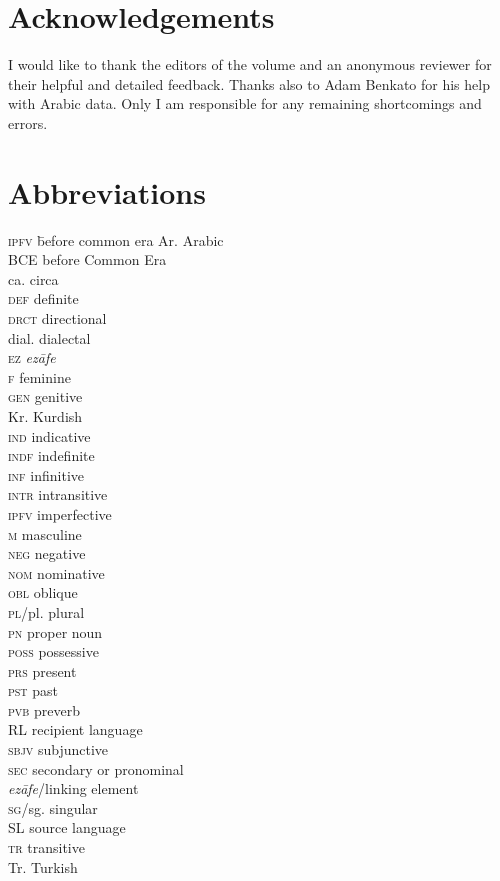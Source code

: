 \documentclass[output=paper]{langsci/langscibook}
\begin{document}
\section*{Acknowledgements}
I would like to thank the editors of the volume and an anonymous reviewer for their helpful and detailed feedback. Thanks also to Adam Benkato for his help with Arabic data. Only I am responsible for any remaining shortcomings and errors. 

\section*{Abbreviations}
\begin{multicols}{2}
\begin{tabbing}
\textsc{ipfv} \hspace{1em} \= before common era\kill
Ar.              \> Arabic\\
BCE             \> before Common Era\\
ca.             \> circa\\
\textsc{def}    \> definite \\
\textsc{drct}   \> directional\\
dial.           \> dialectal \\
\textsc{ez}     \> \textit{ezāfe} \\
\textsc{f}      \> feminine \\
\textsc{gen}    \> genitive\\
Kr.             \> Kurdish\\
\textsc{ind}    \> indicative \\
\textsc{indf}   \> indefinite \\
\textsc{inf}    \> infinitive\\
\textsc{intr}   \> intransitive\\
\textsc{ipfv}   \> imperfective \\
\textsc{m}      \> masculine \\
\textsc{neg}    \> negative\\
\textsc{nom}    \> nominative\\
\textsc{obl}    \> oblique\\
\textsc{pl/}pl. \> plural \\
\textsc{pn}     \> proper noun\\
\textsc{poss}   \> possessive \\
\textsc{prs}    \> present \\
\textsc{pst}    \> past \\
\textsc{pvb}    \> preverb\\
RL              \> recipient language\\
\textsc{sbjv}   \> subjunctive \\
\textsc{sec}    \> secondary or pronominal \\ \> \textit{ezāfe}/linking element\\
\textsc{sg/}sg. \> singular\\
SL              \> source language\\
\textsc{tr}     \> transitive\\
Tr.             \> Turkish
\end{tabbing}
\end{multicols}


{\sloppy\printbibliography[heading=subbibliography,notkeyword=this]}
\end{document}

